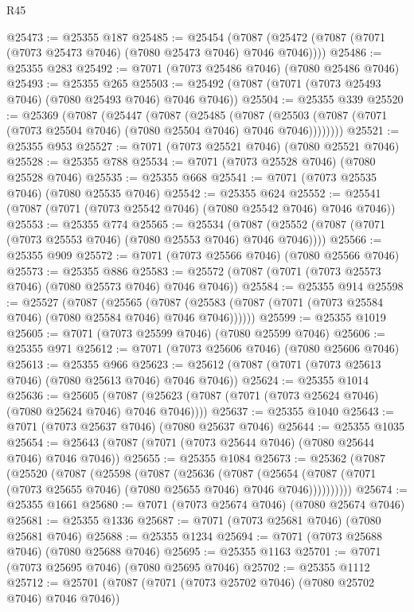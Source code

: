 \begin{lexlean}{R45}
\begin{coremodule}
{@25473 := @25355 @187
@25485 := @25454
    (@7087 (@25472 (@7087 (@7071 (@7073 @25473 @7046) (@7080 @25473 @7046) @7046 @7046))))
@25486 := @25355 @283
@25492 := @7071 (@7073 @25486 @7046) (@7080 @25486 @7046)
@25493 := @25355 @265
@25503 := @25492 (@7087 (@7071 (@7073 @25493 @7046) (@7080 @25493 @7046) @7046 @7046))
@25504 := @25355 @339
@25520 := @25369
    (@7087
      (@25447
        (@7087
          (@25485
            (@7087
              (@25503 (@7087 (@7071 (@7073 @25504 @7046) (@7080 @25504 @7046) @7046 @7046))))))))
@25521 := @25355 @953
@25527 := @7071 (@7073 @25521 @7046) (@7080 @25521 @7046)
@25528 := @25355 @788
@25534 := @7071 (@7073 @25528 @7046) (@7080 @25528 @7046)
@25535 := @25355 @668
@25541 := @7071 (@7073 @25535 @7046) (@7080 @25535 @7046)
@25542 := @25355 @624
@25552 := @25541 (@7087 (@7071 (@7073 @25542 @7046) (@7080 @25542 @7046) @7046 @7046))
@25553 := @25355 @774
@25565 := @25534
    (@7087 (@25552 (@7087 (@7071 (@7073 @25553 @7046) (@7080 @25553 @7046) @7046 @7046))))
@25566 := @25355 @909
@25572 := @7071 (@7073 @25566 @7046) (@7080 @25566 @7046)
@25573 := @25355 @886
@25583 := @25572 (@7087 (@7071 (@7073 @25573 @7046) (@7080 @25573 @7046) @7046 @7046))
@25584 := @25355 @914
@25598 := @25527
    (@7087
      (@25565
        (@7087 (@25583 (@7087 (@7071 (@7073 @25584 @7046) (@7080 @25584 @7046) @7046 @7046))))))
@25599 := @25355 @1019
@25605 := @7071 (@7073 @25599 @7046) (@7080 @25599 @7046)
@25606 := @25355 @971
@25612 := @7071 (@7073 @25606 @7046) (@7080 @25606 @7046)
@25613 := @25355 @966
@25623 := @25612 (@7087 (@7071 (@7073 @25613 @7046) (@7080 @25613 @7046) @7046 @7046))
@25624 := @25355 @1014
@25636 := @25605
    (@7087 (@25623 (@7087 (@7071 (@7073 @25624 @7046) (@7080 @25624 @7046) @7046 @7046))))
@25637 := @25355 @1040
@25643 := @7071 (@7073 @25637 @7046) (@7080 @25637 @7046)
@25644 := @25355 @1035
@25654 := @25643 (@7087 (@7071 (@7073 @25644 @7046) (@7080 @25644 @7046) @7046 @7046))
@25655 := @25355 @1084
@25673 := @25362
    (@7087
      (@25520
        (@7087
          (@25598
            (@7087
              (@25636
                (@7087
                  (@25654
                    (@7087 (@7071 (@7073 @25655 @7046) (@7080 @25655 @7046) @7046 @7046))))))))))
@25674 := @25355 @1661
@25680 := @7071 (@7073 @25674 @7046) (@7080 @25674 @7046)
@25681 := @25355 @1336
@25687 := @7071 (@7073 @25681 @7046) (@7080 @25681 @7046)
@25688 := @25355 @1234
@25694 := @7071 (@7073 @25688 @7046) (@7080 @25688 @7046)
@25695 := @25355 @1163
@25701 := @7071 (@7073 @25695 @7046) (@7080 @25695 @7046)
@25702 := @25355 @1112
@25712 := @25701 (@7087 (@7071 (@7073 @25702 @7046) (@7080 @25702 @7046) @7046 @7046))
}
\end{coremodule}
\end{lexlean}
